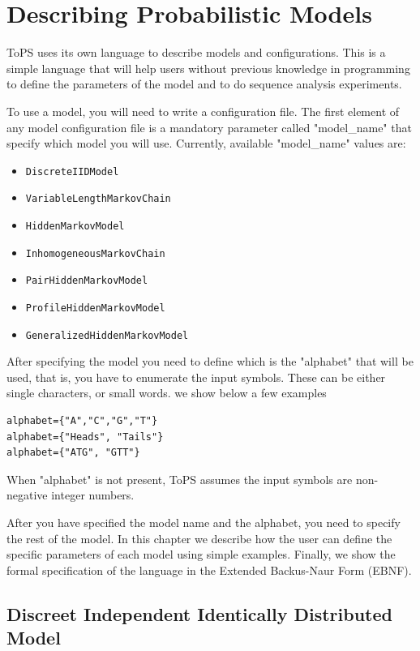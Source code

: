 \chapter{Describing Probabilistic Models}


ToPS uses its own language to describe models and configurations. This is a simple language that will help users without previous knowledge in programming to define the parameters of the model and to do sequence analysis experiments.  

To use a model, you will need to write a configuration file.  The first element of any model configuration file is   a mandatory parameter called "model\_name" that  specify which model you will use. Currently, available "model\_name"  values are:

\begin{itemize}
\item \texttt{DiscreteIIDModel} 
\item \texttt{VariableLengthMarkovChain} 
\item \texttt{HiddenMarkovModel}
\item \texttt{InhomogeneousMarkovChain}
\item \texttt{PairHiddenMarkovModel}
\item \texttt{ProfileHiddenMarkovModel} 
\item \texttt{GeneralizedHiddenMarkovModel}
\end{itemize}

After specifying the model you need to define which is the "alphabet" that will be used, that is, you have to enumerate the input symbols. These can be either single characters, or small words. we show below a few examples
\begin{verbatim}
alphabet={"A","C","G","T"}
alphabet={"Heads", "Tails"}
alphabet={"ATG", "GTT"}
\end{verbatim}
When "alphabet" is not present, ToPS assumes the input symbols are non-negative integer numbers.

After you have specified the model name and the alphabet, you need to specify the rest of the model.
In this chapter we describe how the user can define the specific parameters of each model using simple examples. Finally, we show the formal specification of the language in the Extended Backus-Naur Form (EBNF). 


\section{Discreet Independent Identically Distributed Model}

